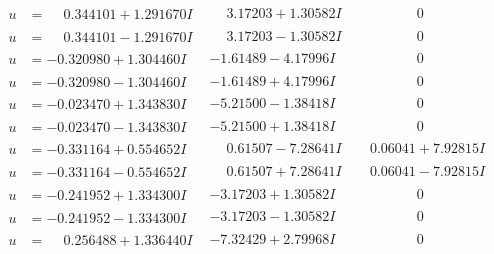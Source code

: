 \documentclass[1p]{elsarticle_modified}
\theoremstyle{definition}
\begin{document}
$$\begin{array}{c|c|c}
 \hline 
\begin{aligned}
u &= \phantom{-}0.344101 + 1.291670 I\end{aligned}
 & \phantom{-}3.17203 + 1.30582 I & \phantom{-0.000000 } 0 \\ \hline\begin{aligned}
u &= \phantom{-}0.344101 - 1.291670 I\end{aligned}
 & \phantom{-}3.17203 - 1.30582 I & \phantom{-0.000000 } 0 \\ \hline\begin{aligned}
u &= -0.320980 + 1.304460 I\end{aligned}
 & -1.61489 - 4.17996 I & \phantom{-0.000000 } 0 \\ \hline\begin{aligned}
u &= -0.320980 - 1.304460 I\end{aligned}
 & -1.61489 + 4.17996 I & \phantom{-0.000000 } 0 \\ \hline\begin{aligned}
u &= -0.023470 + 1.343830 I\end{aligned}
 & -5.21500 - 1.38418 I & \phantom{-0.000000 } 0 \\ \hline\begin{aligned}
u &= -0.023470 - 1.343830 I\end{aligned}
 & -5.21500 + 1.38418 I & \phantom{-0.000000 } 0 \\ \hline\begin{aligned}
u &= -0.331164 + 0.554652 I\end{aligned}
 & \phantom{-}0.61507 - 7.28641 I & \phantom{-}0.06041 + 7.92815 I \\ \hline\begin{aligned}
u &= -0.331164 - 0.554652 I\end{aligned}
 & \phantom{-}0.61507 + 7.28641 I & \phantom{-}0.06041 - 7.92815 I \\ \hline\begin{aligned}
u &= -0.241952 + 1.334300 I\end{aligned}
 & -3.17203 + 1.30582 I & \phantom{-0.000000 } 0 \\ \hline\begin{aligned}
u &= -0.241952 - 1.334300 I\end{aligned}
 & -3.17203 - 1.30582 I & \phantom{-0.000000 } 0 \\ \hline\begin{aligned}
u &= \phantom{-}0.256488 + 1.336440 I\end{aligned}
 & -7.32429 + 2.79968 I & \phantom{-0.000000 } 0 \\ \hline\begin{aligned}

\end{aligned}
\end{array}$$
\end{document}
